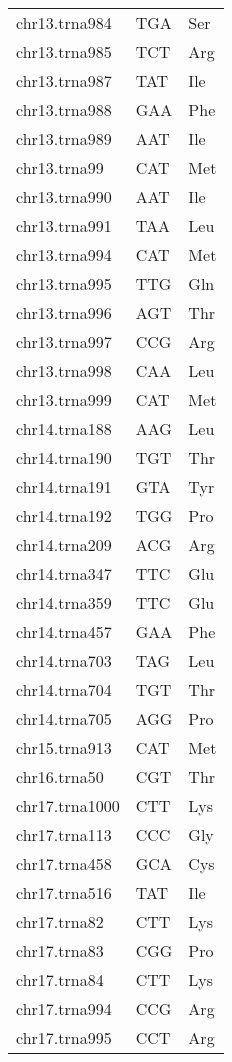 \begin{longtable}{@{}l>{\collectcell\anticodon}l<{\endcollectcell}l@{}}
    chr13.trna984 & TGA & Ser \\
    chr13.trna985 & TCT & Arg \\
    chr13.trna987 & TAT & Ile \\
    chr13.trna988 & GAA & Phe \\
    chr13.trna989 & AAT & Ile \\
    chr13.trna99 & CAT & Met \\
    chr13.trna990 & AAT & Ile \\
    chr13.trna991 & TAA & Leu \\
    chr13.trna994 & CAT & Met \\
    chr13.trna995 & TTG & Gln \\
    chr13.trna996 & AGT & Thr \\
    chr13.trna997 & CCG & Arg \\
    chr13.trna998 & CAA & Leu \\
    chr13.trna999 & CAT & Met \\
    chr14.trna188 & AAG & Leu \\
    chr14.trna190 & TGT & Thr \\
    chr14.trna191 & GTA & Tyr \\
    chr14.trna192 & TGG & Pro \\
    chr14.trna209 & ACG & Arg \\
    chr14.trna347 & TTC & Glu \\
    chr14.trna359 & TTC & Glu \\
    chr14.trna457 & GAA & Phe \\
    chr14.trna703 & TAG & Leu \\
    chr14.trna704 & TGT & Thr \\
    chr14.trna705 & AGG & Pro \\
    chr15.trna913 & CAT & Met \\
    chr16.trna50 & CGT & Thr \\
    chr17.trna1000 & CTT & Lys \\
    chr17.trna113 & CCC & Gly \\
    chr17.trna458 & GCA & Cys \\
    chr17.trna516 & TAT & Ile \\
    chr17.trna82 & CTT & Lys \\
    chr17.trna83 & CGG & Pro \\
    chr17.trna84 & CTT & Lys \\
    chr17.trna994 & CCG & Arg \\
    chr17.trna995 & CCT & Arg \\

\end{longtable}
